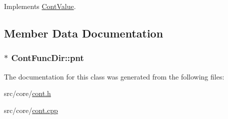 Implements \hyperlink{a00086_ae3ce98084899bf1a873a1ec6bf15116e}{Cont\-Value}.



\subsection{Member Data Documentation}
\hypertarget{a00052_aae431b4159623c57365bf905bbe8de00}{
\subsubsection[{pnt}]{$\ast$ Cont\-Func\-Dir\-::pnt\hspace{0.3cm}{\ttfamily [private]}}}\label{a00052_aae431b4159623c57365bf905bbe8de00}


The documentation for this class was generated from the following files\-:\begin{DoxyCompactItemize}
\item 
src/core/\hyperlink{a00218}{cont.\-h}\item 
src/core/\hyperlink{a00217}{cont.\-cpp}\end{DoxyCompactItemize}
